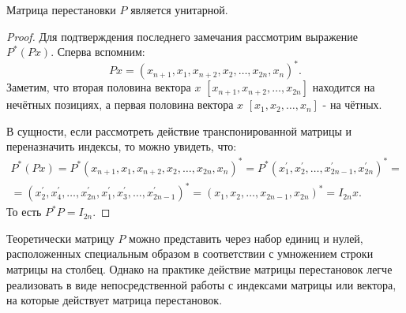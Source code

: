 \begin{claim}
    Матрица перестановки \(P\) является унитарной.
\end{claim}
\begin{proof}
    Для подтверждения последнего замечания рассмотрим выражение \(P^*(Px)\). Сперва вспомним: 
    \begin{equation}
        Px=(x_{n+1},x_1, x_{n+2},x_2,\dots,x_{2n},x_n)^*.
    \end{equation}
    Заметим, что вторая половина вектора \(x\) \([x_{n+1},x_{n+2},\dots,x_{2n}]\) находится на нечётных позициях, а первая половина вектора  \(x\) \([x_{1},x_{2},\dots,x_{n}]\) - на чётных. 

    В сущности, если рассмотреть действие транспонированной матрицы и переназначить индексы, то можно увидеть, что:
    \begin{equation*}
        \begin{split}
            P^*(Px)=P^*(x_{n+1},x_1, x_{n+2},x_2,\dots,x_{2n},x_n)^*=P^*(x_{1}^\prime,x_2^\prime,\dots,x_{2n-1}^\prime,x_{2n}^\prime)^*=\\[6pt]=(x_2^\prime,x_4^\prime,\dots,x_{2n}^\prime,x_1^\prime,x_3^\prime,\dots,x_{2n-1}^\prime)^*=(x_{1},x_2,\dots,x_{2n-1},x_{2n})^*=I_{2n}x. 
        \end{split}
    \end{equation*}
    То есть \(P^*P=I_{2n}\).
\end{proof}

\begin{note}
    Теоретически матрицу \(P\) можно представить через набор единиц и нулей, расположенных специальным образом в соответствии с умножением строки матрицы на столбец. Однако на практике действие матрицы перестановок легче реализовать в виде непосредственной работы с индексами матрицы или вектора, на которые действует матрица перестановок.   
\end{note}

